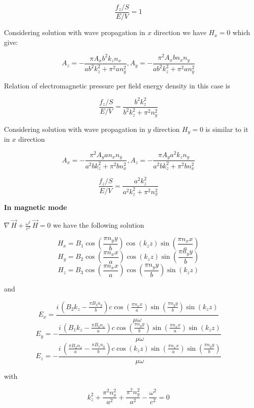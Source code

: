 \documentclass[11pt]{article}
\begin{document}
\[\frac{f_z/S}{E/V} = 1\]

    Considering solution with wave propagation in \(x\) direction we have
\(H_x = 0\) which give:

    \[A_{z} = -\frac{\pi A_{x} b^{2} k_{z} n_{x}}{a b^{2} k_{z}^{2} + \pi^{2} a n_{y}^{2}},
A_{y} = -\frac{\pi^{2} A_{x} b n_{x} n_{y}}{a b^{2} k_{z}^{2} + \pi^{2} a n_{y}^{2}}\]

    Relation of electromagnetic pressure per field energy density in this
case is

\[\frac{f_z/S}{E/V} = \frac{b^{2} k_{z}^{2}}{b^{2} k_{z}^{2} + \pi^{2} n_{y}^{2}}\]

    Considering solution with wave propagation in \(y\) direction
\(H_y = 0\) is similar to it in \(x\) direction

\[A_{x} = -\frac{\pi^{2} A_{y} a n_{x} n_{y}}{a^{2} b k_{z}^{2} + \pi^{2} b n_{x}^{2}},
A_{z} = -\frac{\pi A_{y} a^{2} k_{z} n_{y}}{a^{2} b k_{z}^{2} + \pi^{2} b n_{x}^{2}}\]

\[\frac{f_z/S}{E/V} = \frac{a^{2} k_{z}^{2}}{a^{2} k_{z}^{2} + \pi^{2} n_{x}^{2}}\]

    \textbf{In magnetic mode}

\(\nabla\,\vec{H} + \frac{\omega^2}{c^2}\,\vec{H} = 0\) we have the
following solution

    \[H_{x} = B_{1} \cos\left(\frac{\pi n_{y} y}{b}\right) \cos\left(k_{z} z\right) \sin\left(\frac{\pi n_{x} x}{a}\right)\]
\[H_{y} = B_{2} \cos\left(\frac{\pi n_{x} x}{a}\right) \cos\left(k_{z} z\right) \sin\left(\frac{\pi n_{y} y}{b}\right)\]
\[H_{z} = B_{3} \cos\left(\frac{\pi n_{x} x}{a}\right) \cos\left(\frac{\pi n_{y} y}{b}\right) \sin\left(k_{z} z\right)\]

    and

\[E_{x} = \frac{i \, {\left(B_{2} k_{z} - \frac{\pi B_{3} n_{y}}{b}\right)} c \cos\left(\frac{\pi n_{x} x}{a}\right) \sin\left(\frac{\pi n_{y} y}{b}\right) \sin\left(k_{z} z\right)}{\mu \omega}\]
\[E_{y} = -\frac{i \, {\left(B_{1} k_{z} - \frac{\pi B_{3} n_{x}}{a}\right)} c \cos\left(\frac{\pi n_{y} y}{b}\right) \sin\left(\frac{\pi n_{x} x}{a}\right) \sin\left(k_{z} z\right)}{\mu \omega}\]
\[E_{z} = -\frac{i \, {\left(\frac{\pi B_{2} n_{x}}{a} - \frac{\pi B_{1} n_{y}}{b}\right)} c \cos\left(k_{z} z\right) \sin\left(\frac{\pi n_{x} x}{a}\right) \sin\left(\frac{\pi n_{y} y}{b}\right)}{\mu \omega}\]

    with

\[k_{z}^{2} + \frac{\pi^{2} n_{x}^{2}}{a^{2}} + \frac{\pi^{2} n_{y}^{2}}{a^{2}} - \frac{\omega^{2}}{c^{2}} = 0\]
\end{document}
